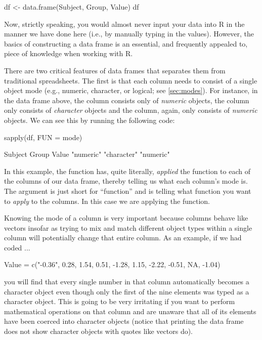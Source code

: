 \begin{inR}
df <- data.frame(Subject, Group, Value)
df
\end{inR}

Now, strictly speaking, you would almost never input your data into R in the manner we have done here (i.e., by manually typing in the values). However, the basics of constructing a data frame is an essential, and frequently appealed to, piece of knowledge when working with R.

There are two critical features of data frames that separates them from traditional spreadsheets.  The first is that each column needs to consist of a single object mode (e.g., numeric, character, or logical; see \ref{sec:modes}). For instance, in the data frame above, the  column consists only of \textit{numeric} objects, the  column only consists of \textit{character} objects and the  column, again, only consists of \textit{numeric} objects. We can see this by running the following code:

\begin{inR}
sapply(df, FUN = mode) 
\end{inR}

\begin{outR}
     Subject       Group       Value 
  "numeric" "character"   "numeric"    
\end{outR}

In this example, the  function has, quite literally, \textit{applied} the function  to each of the columns of our data frame, thereby telling us what each column's mode is. The argument  is just short for ``function'' and is telling  what function you want to \textit{apply} to the columns. In this case we are applying the  function. 

Knowing the mode of a column is very important because columns behave like vectors insofar as trying to mix and match different object types within a single column will potentially change that entire column.  As an example, if we had coded ... 

\begin{inR}
Value = c("-0.36", 0.28, 1.54, 0.51, -1.28, 1.15, -2.22, -0.51, NA, -1.04)
\end{inR}

\vspace{1em}

\noindent
you will find that every single number in that column automatically becomes a character object even though only the first of the nine elements was typed as a character object. This is going to be very irritating if you want to perform mathematical operations on that column and are unaware that all of its elements have been coerced into character objects (notice that printing the data frame does not show character objects with quotes like vectors do).


